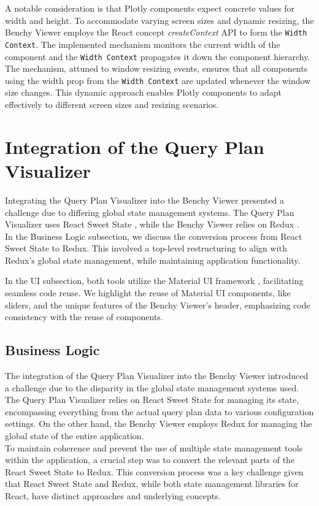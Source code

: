 A notable consideration is that Plotly components expect concrete values for width and height. To accommodate varying screen sizes and dynamic resizing, the Benchy Viewer employs the React concept \textit{createContext} API \parencite{createContext} to form the \texttt{Width Context}. The implemented mechanism monitors the current width of the component and the \texttt{Width Context} propagates it down the component hierarchy. The mechanism, attuned to window resizing events, ensures that all components using the width prop from the \texttt{Width Context} are updated whenever the window size changes. This dynamic approach enables Plotly components to adapt effectively to different screen sizes and resizing scenarios.








\section{Integration of the Query Plan Visualizer}\label{sec:semantic-diff-integration}
Integrating the Query Plan Visualizer into the Benchy Viewer presented a challenge due to differing global state management systems. The Query Plan Visualizer uses React Sweet State \parencite*{react-sweet-state}, while the Benchy Viewer relies on Redux \parencite*{Redux}.\\
In the Business Logic subsection, we discuss the conversion process from React Sweet State to Redux. This involved a top-level restructuring to align with Redux's global state management, while maintaining application functionality.

In the UI subsection, both tools utilize the Material UI framework \parencite*{mui}, facilitating seamless code reuse. We highlight the reuse of Material UI components, like sliders, and the unique features of the Benchy Viewer's header, emphasizing code consistency with the reuse of components.


\subsection{Business Logic}

The integration of the Query Plan Visualizer into the Benchy Viewer introduced a challenge due to the disparity in the global state management systems used. The Query Plan Visualizer relies on React Sweet State for managing its state, encompassing everything from the actual query plan data to various configuration settings. On the other hand, the Benchy Viewer employs Redux for managing the global state of the entire application.\\
To maintain coherence and prevent the use of multiple state management tools within the application, a crucial step was to convert the relevant parts of the React Sweet State to Redux. This conversion process was a key challenge given that React Sweet State and Redux, while both state management libraries for React, have distinct approaches and underlying concepts.

